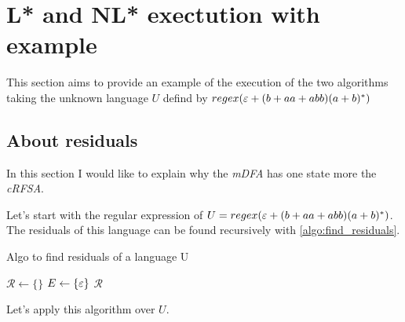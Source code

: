\section{L* and NL* exectution with example}

This section aims to provide an example of the execution of the two algorithms taking the unknown language $U$ defind by $regex(\varepsilon+(b+aa+abb)(a+b)^*)$ %



\subsection{About residuals}
In this section I would like to explain why the \textit{mDFA} has one state more the \textit{cRFSA}.



\begin{algorithm}[H]Let's start with the regular expression of $U = regex(\varepsilon+(b+aa+abb)(a+b)^*)$. The residuals of this language can be found recursively with \cref{algo:find_residuals}.
  \caption{Algo to find residuals of a language U}
  \label{algo:find_residuals}
  $\mathcal{R} \gets \{\}$ 
  $E \gets \{\varepsilon\}$
  \Return $\mathcal{R}$
\end{algorithm}

Let's apply this algorithm over $U$.


